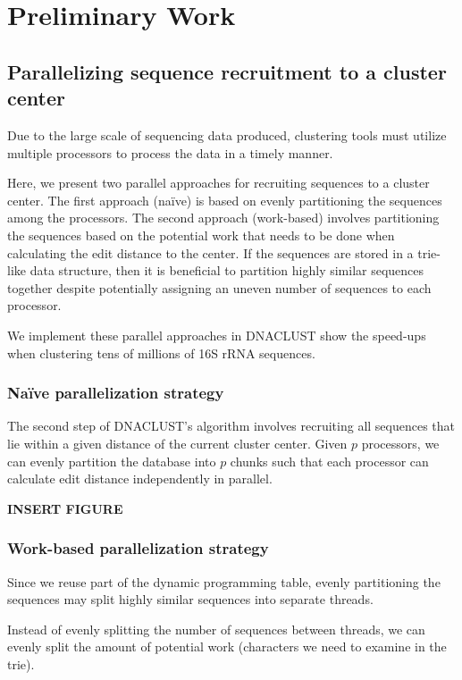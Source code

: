 \section{Preliminary Work}

\subsection{Parallelizing sequence recruitment to a cluster center}

Due to the large scale of sequencing data produced, clustering tools must utilize multiple processors to process the data in a timely manner.

Here, we present two parallel approaches for recruiting sequences to a cluster center.
The first approach (na{\"i}ve) is based on evenly partitioning the sequences among the processors.
The second approach (work-based) involves partitioning the sequences based on the potential work that needs to be done when calculating the edit distance to the center.
If the sequences are stored in a trie-like data structure, then it is beneficial to partition highly similar sequences together despite potentially assigning an uneven number of sequences to each processor.

We implement these parallel approaches in DNACLUST\cite{ghodsi_dnaclust:_2011} show the speed-ups when clustering tens of millions of 16S rRNA sequences. 

\subsubsection{Na{\"i}ve parallelization strategy}

The second step of DNACLUST's algorithm involves recruiting all sequences that lie within a given distance of the current cluster center.
Given $p$ processors, we can evenly partition the database into $p$ chunks such that each processor can calculate edit distance independently in parallel.

{\bf INSERT FIGURE}

\subsubsection{Work-based parallelization strategy}

Since we reuse part of the dynamic programming table, evenly partitioning the sequences may split highly similar sequences into separate threads.

Instead of evenly splitting the number of sequences between threads, we can evenly split the amount of potential work (characters we need to examine in the trie).

